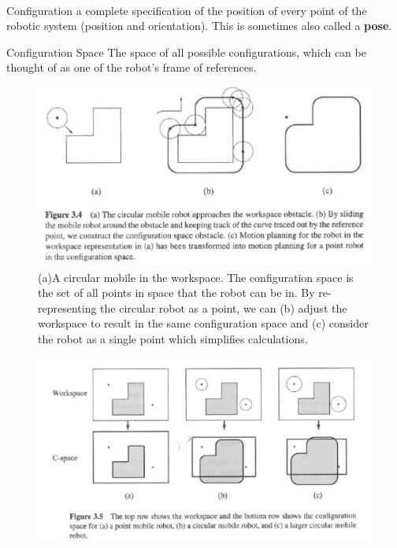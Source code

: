 \documentclass[13pt]{article}
\begin{document}
\hfill \\
\noindent
\begin{defn}{Configuration}
	a complete specification of the position of every point of the robotic system (position and orientation). This is
	sometimes also called a \textbf{pose}.
\end{defn}

\begin{defn}{Configuration Space}
	The space of all possible configurations, which can be thought of as one of the robot's frame of references.
\end{defn}

\begin{figure}
	\centering
	\includegraphics[width=\linewidth]{figures/cspace}
	\caption{(a)A circular mobile in the workspace. The configuration space is the set of all points in space that the
	robot can be in. By re-representing the circular robot as a point, we can (b) adjust the workspace to result in the
	same configuration space and (c) consider the robot as a single point which simplifies calculations.}
	\label{fig:config_space}
\end{figure}

\begin{figure}
	\centering
	\includegraphics[width=\linewidth]{figures/cspace2}
\end{figure}
\end{document}
